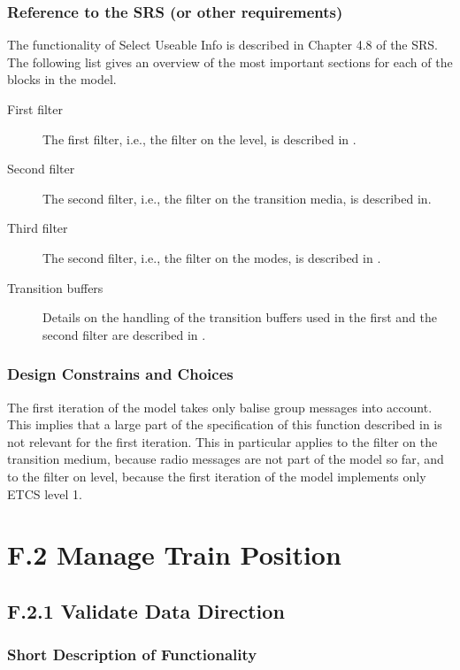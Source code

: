 \documentclass{template/openetcs_report}
\begin{document}
\subsubsection{Reference to the SRS (or other requirements)}
The functionality of Select Useable Info is described in Chapter 4.8 of the SRS. The following list gives an overview of the most important sections for each of the blocks in the model.

\begin{description}
\item[First filter] The first filter, i.e., the filter on the level, is described in \cite[Chapter~4.8.3]{subset-026}.
\item[Second filter] The second filter, i.e., the filter on the transition media, is described in\cite[Chapter~4.8.3]{subset-026}.
\item[Third filter]
 The second filter, i.e., the filter on the modes, is described in \cite[Chapter~4.8.4]{subset-026}.
\item[Transition buffers] Details on the handling of the transition buffers used in the first and the second filter are described in \cite[Chapter~4.8.5]{subset-026}.
\end{description}

\subsubsection{Design Constrains and Choices}
The first iteration of the model takes only balise group messages into account. This implies that a large part of the specification of this function described in \cite{subset-026} is not relevant for the first iteration. This in particular applies to the filter on the transition medium, because radio messages are not part of the model so far, and to the filter on level, because the first iteration of the model implements only ETCS level 1.

\section{F.2 Manage Train Position}


\subsection{F.2.1 Validate Data Direction}

\subsubsection{Short Description of Functionality}
\end{document}
